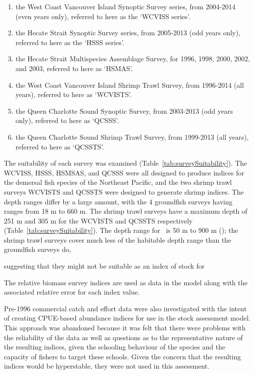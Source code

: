 \begin{enumerate}
  \item the West Coast Vancouver Island Synoptic Survey series, from 2004-2014 (even years only), referred to here as the `WCVISS series'.
  \item the Hecate Strait Synoptic Survey series, from 2005-2013 (odd years only), referred to here as the `HSSS series'.
  \item the Hecate Strait Multispecies Assemblage Survey, for 1996, 1998, 2000, 2002, and 2003, referred to here as `HSMAS'.
  \item the West Coast Vancouver Island Shrimp Trawl Survey, from 1996-2014 (all years), referred to here as `WCVISTS'.
  \item the Queen Charlotte Sound Synoptic Survey, from 2003-2013 (odd years only), referred to here as `QCSSS'.
  \item the Queen Charlotte Sound Shrimp Trawl Survey, from 1999-2013 (all years), referred to here as `QCSSTS'.
\end{enumerate}

The suitability of each survey was examined (Table~\ref{tab:surveySuitability}). The WCVISS, HSSS, HSMSAS, and QCSSS were all designed to produce indices for the demersal fish species of the Northeast Pacific, and the two shrimp trawl surveys WCVISTS and QCSSTS were designed to generate shrimp indices. The depth ranges differ by a large amount, with the 4 groundfish surveys having ranges from 18 m to 660 m. The shrimp trawl surveys have a maximum depth of 251 m and 305 m for the WCVISTS and QCSSTS respectively (Table~\ref{tab:surveySuitability}). The depth range for \fishname\ is 50 m to 900 m (\citet{arf2001}); the shrimp trawl surveys cover much less of the habitable depth range than the groundfish surveys do, 

suggesting that they might not be suitable as an index of stock for

The relative biomass survey indices are used as data in the model along with the associated relative error for each index value.

Pre-1996 commercial catch and effort data were also investigated with the intent of creating CPUE-based abundance indices for use in the stock assessment model. This approach was abandoned because it was felt that there were problems with the reliability of the data as well as questions as to the representative nature of the resulting indices, given the schooling behaviour of the species and the capacity of fishers to target these schools. Given the concern that the resulting indices would be hyperstable, they were not used in this assessment.

